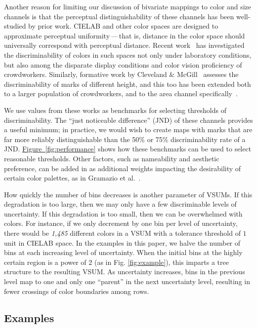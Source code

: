 \documentclass{vgtc}                          %
\newcommand{\figref}[1]{\hyperref[#1]{Figure~\ref*{#1}}}
\begin{document}
Another reason for limiting our discussion of bivariate mappings to color and size channels is that the perceptual distinguishability of these channels has been well-studied by prior work. CIELAB and other color spaces are designed to approximate perceptual uniformity\,---\,that is, distance in the color space should universally correspond with perceptual distance. Recent work~\cite{stone2014engineering,szafir2014adapting} has investigated the discriminability of colors in such spaces not only under laboratory conditions, but also among the disparate display conditions and color vision proficiency of crowdworkers. Similarly, formative work by Cleveland \& McGill~\cite{cleveland1984graphical} assesses the discriminability of marks of different height, and this too has been extended both to a larger population of crowdworkers, and to the area channel specifically~\cite{heer2010crowdsourcing,talbot2014four}.

We use values from these works as benchmarks for selecting thresholds of discriminability. The ``just noticeable difference'' (JND) of these channels provides a useful minimum; in practice, we would wish to create maps with marks that are far more reliably distinguishable than the 50\% or 75\% discriminability rate of a JND. \figref{fig:performance} shows how these benchmarks can be used to select reasonable thresholds. Other factors, such as nameability and aesthetic preference, can be added in as additional weights impacting the desirability of certain color palettes, as in Gramazio et al.~\cite{gramazio2017colorgorical}.

How quickly the number of bins decreases is another parameter of VSUMs. If this degradation is too large, then we may only have a few discriminable levels of uncertainty. If this degradation is too small, then we can be overwhelmed with colors. For instance, if we only decrement by one bin per level of uncertainty, there would be \emph{1,485} different colors in a VSUM with a tolerance threshold of $1$ unit in CIELAB space. In the examples in this paper,  we halve the number of bins at each increasing level of uncertainty. When the initial bins at the highly certain region is a power of $2$ (as in Fig. \ref{fig:example}), this imparts a tree structure to the resulting VSUM. As uncertainty increases, bins in the previous level map to one and only one ``parent'' in the next uncertainty level, resulting in fewer crossings of color boundaries among rows.

\subsection{Examples}
\end{document}
